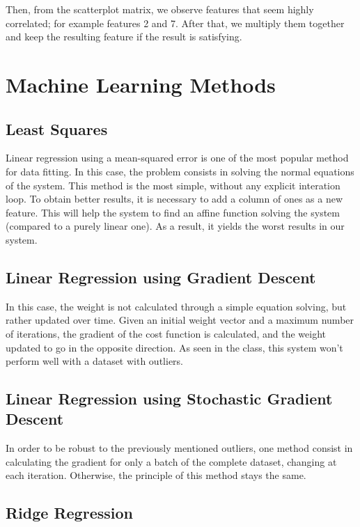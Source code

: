 \documentclass[10pt,conference,compsocconf]{IEEEtran}
\begin{document}
Then, from the scatterplot matrix, we observe features that seem highly correlated; for example features 2 and 7. After that, we multiply them together and keep the resulting feature if the result is satisfying.

\section{Machine Learning Methods}

\subsection{Least Squares}

Linear regression using a mean-squared error is one of the most popular method for data fitting. In this case, the problem consists in solving the normal equations of the system. This method is the most simple, without any explicit interation loop. To obtain better results, it is necessary to add a column of ones as a new feature. This will help the system to find an affine function solving the system (compared to a purely linear one). As a result, it yields the worst results in our system.

\subsection{Linear Regression using Gradient Descent}

In this case, the weight is not calculated through a simple equation solving, but rather updated over time. Given an initial weight vector and a maximum number of iterations, the gradient of the cost function is calculated, and the weight updated to go in the opposite direction. As seen in the class, this system won't perform well with a dataset with outliers.

\subsection{Linear Regression using Stochastic Gradient Descent}

In order to be robust to the previously mentioned outliers, one method consist in calculating the gradient for only a batch of the complete dataset, changing at each iteration. Otherwise, the principle of this method stays the same. 

\subsection{Ridge Regression}
\end{document}

